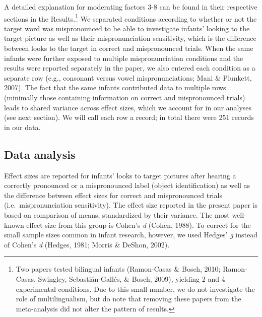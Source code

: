 \documentclass[man]{apa6}
\let\rmarkdownfootnote\footnote%
\def\footnote{\protect\rmarkdownfootnote}
\begin{document}
A detailed explanation for moderating factors 3-8 can be found in their respective sections in the Results.\footnote{Two papers tested bilingual infants (Ramon-Casas \& Bosch, 2010; Ramon-Casas, Swingley, Sebastián-Gallés, \& Bosch, 2009), yielding 2 and 4 experimental conditions. Due to this small number, we do not investigate the role of multilingualism, but do note that removing these papers from the meta-analysis did not alter the pattern of results.} We separated conditions according to whether or not the target word was mispronounced to be able to investigate infants' looking to the target picture as well as their mispronunciation sensitivity, which is the difference between looks to the target in correct and mispronounced trials. When the same infants were further exposed to multiple mispronunciation conditions and the results were reported separately in the paper, we also entered each condition as a separate row (e.g., consonant versus vowel mispronunciations; Mani \& Plunkett, 2007). The fact that the same infants contributed data to multiple rows (minimally those containing information on correct and mispronounced trials) leads to shared variance across effect sizes, which we account for in our analyses (see next section). We will call each row a record; in total there were 251 records in our data.

\hypertarget{data-analysis}{%
\subsection{Data analysis}\label{data-analysis}}

Effect sizes are reported for infants' looks to target pictures after hearing a correctly pronounced or a mispronounced label (object identification) as well as the difference between effect sizes for correct and mispronounced trials (i.e.~mispronunciation sensitivity). The effect size reported in the present paper is based on comparison of means, standardized by their variance. The most well-known effect size from this group is Cohen's \emph{d} (Cohen, 1988). To correct for the small sample sizes common in infant research, however, we used Hedges' \emph{g} instead of Cohen's \emph{d} (Hedges, 1981; Morris \& DeShon, 2002).
\end{document}
